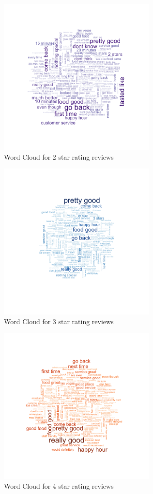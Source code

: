 \documentclass[paper=a4, fontsize=11pt]{scrartcl} %
\numberwithin{equation}{section} %
\numberwithin{figure}{section} %
\numberwithin{table}{section} %
\begin{document}
\begin{figure}[!htb]
\centering
\includegraphics[width=300px, height = 300px]{2_star_wordcloud_500k.png}
\caption{Word Cloud for 2 star rating reviews}
\label{wc2}
\end{figure} 

\begin{figure}[!htb]
\centering
\includegraphics[width=300px, height = 300px]{3_star_wordcloud_500k.png}
\caption{Word Cloud for 3 star rating reviews}
\label{wc3}
\end{figure} 

\begin{figure}[!htb]
\centering
\includegraphics[width=300px, height = 300px]{4_star_wordcloud_500k.png}
\caption{Word Cloud for 4 star rating reviews}
\label{wc4}
\end{figure} 
\end{document}
